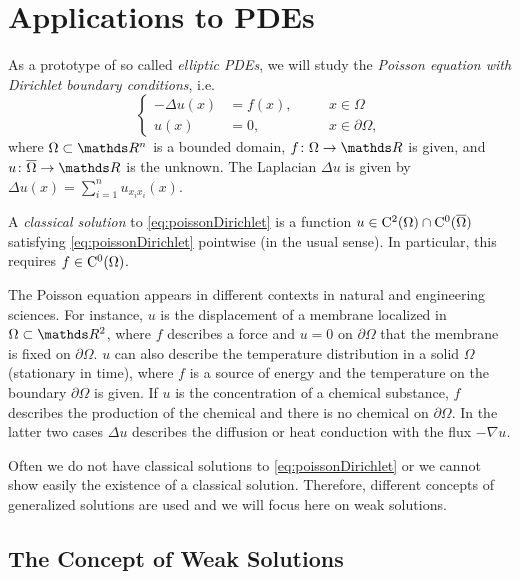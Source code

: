 \chapter{Applications to PDEs}
\label{chap:appsToPDEs}

As a prototype of so called \emph{elliptic PDEs}, we will study the \emph{Poisson equation with Dirichlet boundary conditions}, i.e.
\begin{equation}
  \label{eq:poissonDirichlet}
  \left\{
    \begin{alignedat}{2}
    -\Delta u(x) &= f(x), &&\quad x \in \Omega \\
    u(x) &= 0, &&\quad x \in \partial\Omega,
    \end{alignedat}
    \right.
\end{equation}
where $\Omega \subset \R^n$ is a bounded domain, $f \colon \Omega \to \R$ is given, and $u \colon \overline \Omega \to \R$ is the unknown.
The Laplacian $\Delta u$ is given by $\Delta u(x) = \sum_{i = 1}^n u_{x_i x_i}(x)$.

\begin{defn}
  A \emph{classical solution} to \eqref{eq:poissonDirichlet} is a function $u \in \mathrm{C}^2(\Omega) \cap \mathrm{C}^0(\overline\Omega)$ satisfying \eqref{eq:poissonDirichlet} pointwise (in the usual sense).
  In particular, this requires $f \in \mathrm{C}^0(\Omega)$.
\end{defn}

  The Poisson equation appears in different contexts in natural and engineering sciences.
  For instance, $u$ is the displacement of a membrane localized in $\Omega \subset \R^2$, where $f$ describes a force and $u = 0$ on $\partial\Omega$ that the membrane is fixed on $\partial\Omega$.
  $u$ can also describe the temperature distribution in a solid $\Omega$ (stationary in time), where $f$ is a source of energy and the temperature on the boundary $\partial\Omega$ is given.
  If $u$ is the concentration of a chemical substance, $f$ describes the production of the chemical and there is no chemical on $\partial\Omega$.
  In the latter two cases $\Delta u$ describes the diffusion or heat conduction with the flux $-\nabla u$.

  Often we do not have classical solutions to \eqref{eq:poissonDirichlet} or we cannot show easily the existence of a classical solution.
  Therefore, different concepts of generalized solutions are used and we will focus here on weak solutions.

\section{The Concept of Weak Solutions}
\label{sec:weakSolutions}

